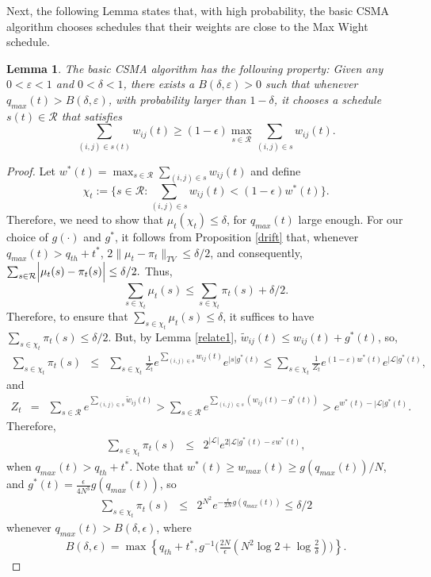 \documentclass[10pt,onecolumn,draftclsnofoot,journal]{IEEEtran}
\newtheorem{lemma}{Lemma}
\newcommand{\ben}{\begin{eqnarray*}}
\newcommand{\een}{\end{eqnarray*}}
\begin{document}
Next, the following Lemma states that, with high probability, the basic CSMA algorithm chooses schedules that their weights are close to the Max Wight schedule.
\begin{lemma}\label{property}
The basic CSMA algorithm has the following property: Given any $0<\varepsilon<1$ and $0<\delta<1$, there exists a $B(\delta, \varepsilon)>0$ such that whenever $q_{max}(t) >B(\delta, \varepsilon)$, with probability larger than $1-\delta$, it chooses a schedule $s(t) \in \mathcal{R}$ that satisfies
$$
\sum_{(i,j) \in s(t)}w_{ij}(t) \geq (1-\epsilon) \max_{s \in \mathcal{R}} \sum_{(i,j) \in s}w_{ij}(t).
$$
\end{lemma}
\begin{proof}
Let $w^*(t)=\max_{s \in \mathcal{R}} \sum_{(i,j) \in s} w_{ij}(t)$ and define
$$
\chi_t:=\Big\{s \in \mathcal{R}: \sum_{(i,j) \in s}w_{ij}(t) < (1-\epsilon) w^*(t) \Big\}.
$$
Therefore, we need to show that $\mu_t(\chi_t) \leq \delta$, for $q_{max}(t)$ large enough. For our choice of $g(\cdot)$ and $g^*$, it follows from Proposition \ref{drift} that, whenever $q_{max}(t)> q_{th}+t^*$, $2 \|\mu_t-\pi_t\|_{TV} \leq \delta/2$,
and consequently, $
\sum_{s \in \mathcal{R}} \Bigl |\mu_t(s)-\pi_t(s)\Bigr| \leq \delta/2.
$
Thus,
$$
\sum_{s \in \mathcal{\chi}_t} \mu_t(s) \leq \sum_{s \in \mathcal{\chi}_t} \pi_t(s)+\delta/2.
$$
Therefore, to ensure that $\sum_{s \in \chi_t} \mu_t(s) \leq \delta$, it suffices to have $
\sum_{s \in \mathcal{\chi}_t}\pi_t(s) \leq \delta/2.
$
But, by Lemma \ref{relate1}, $\widetilde{w}_{ij}(t) \leq w_{ij}(t)+g^*(t)$,
so,
\begin{eqnarray*}
\sum_{s \in \mathcal{\chi}_t} \pi_t(s) &\leq & \sum_{s \in \mathcal{\chi}_t} \frac{1}{Z_t}e^{\sum_{(i,j) \in s}{w}_{ij}(t)}e^{|s|g^*(t)}\leq \sum_{s \in \mathcal{\chi}_t} \frac{1}{Z_t}e^{(1-\varepsilon)w^*(t)}e^{|\mathcal{L}|g^*(t)},
\end{eqnarray*}
and
\ben
Z_t &=& \sum_{s \in \mathcal{R}}e^{\sum_{(i,j) \in s}\widetilde{w}_{ij}(t)} > \sum_{s \in \mathcal{R}}e^{\sum_{(i,j) \in s}(w_{ij}(t)-g^*(t))}
> e^{w^*(t)-|\mathcal{L}|g^*(t)}.
\een
Therefore,
\ben
\sum_{s \in \mathcal{\chi}_t} \pi_t(s) &\leq & 2^{|\mathcal{L}|}e^{2|\mathcal{L}|g^*(t)-\varepsilon w^*(t)},
\een
when $q_{max}(t)> q_{th}+t^*$. Note that $w^*(t)\geq w_{max}(t) \geq g(q_{max}(t))/{N}$, and $g^*(t)=\frac{\epsilon}{4N^3}g(q_{max}(t))$, so
\begin{eqnarray}
\sum_{s \in \mathcal{\chi}_t} \pi_t(s) &\leq & 2^{N^2}e^{-\frac{\epsilon}{2{N}}g(q_{max}(t))} \leq \delta/2 \nonumber
\end{eqnarray}
whenever $q_{max}(t) > B(\delta, \epsilon)$, where
\ben
B(\delta,\epsilon)=\max\left\{q_{th}+t^*, g^{-1}\Big(\frac{2{N}}{\epsilon}(N^2 \log{2}+\log{\frac{2}{\delta}})\Big)\right\}.
\een
\end{proof}
\end{document}
